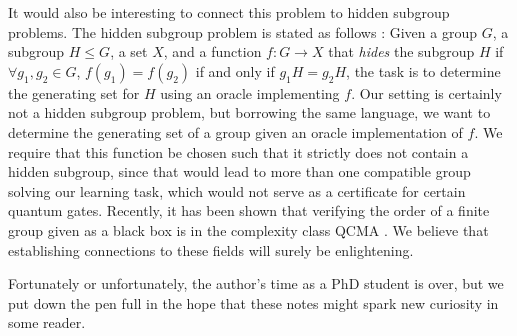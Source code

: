 \documentclass[../main.tex]{subfiles}
\begin{document}
It would also be interesting to connect this problem to hidden subgroup problems. The hidden subgroup problem is stated as follows \cite{lomont2004the}: Given a group $G$, a subgroup $H \leq G$, a set $X$, and a function $f: G \to X$ that \textit{hides} the subgroup $H$ if $\forall g_1, g_2 \in G$, $f(g_1) = f(g_2)$ if and only if $g_1H = g_2H$, the task is to determine the generating set for $H$ using an oracle implementing $f$.
Our setting is certainly not a hidden subgroup problem, but borrowing the same language, we want to determine the generating set of a group given an oracle implementation of $f$. We require that this function be chosen such that it strictly does not contain a hidden subgroup, since that would lead to more than one compatible group solving our learning task, which would not serve as a certificate for certain quantum gates. Recently, it has been shown that verifying the order of a finite group given as a black box is in the complexity class QCMA \cite{gall2025group}. We believe that establishing connections to these fields will surely be enlightening.

Fortunately or unfortunately, the author's time as a PhD student is over, but we put down the pen full in the hope that these notes might spark new curiosity in some reader.
\end{document}
